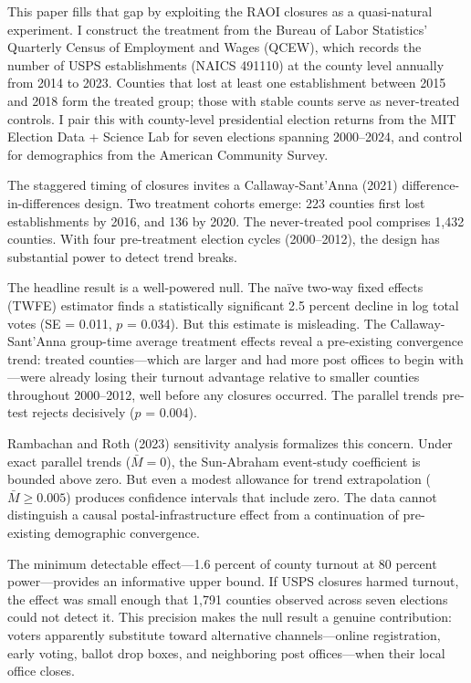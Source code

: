 \documentclass[12pt]{article}
\begin{document}
This paper fills that gap by exploiting the RAOI closures as a quasi-natural experiment. I construct the treatment from the Bureau of Labor Statistics' Quarterly Census of Employment and Wages (QCEW), which records the number of USPS establishments (NAICS 491110) at the county level annually from 2014 to 2023. Counties that lost at least one establishment between 2015 and 2018 form the treated group; those with stable counts serve as never-treated controls. I pair this with county-level presidential election returns from the MIT Election Data + Science Lab for seven elections spanning 2000--2024, and control for demographics from the American Community Survey.

The staggered timing of closures invites a Callaway-Sant'Anna (2021) difference-in-differences design. Two treatment cohorts emerge: 223 counties first lost establishments by 2016, and 136 by 2020. The never-treated pool comprises 1,432 counties. With four pre-treatment election cycles (2000--2012), the design has substantial power to detect trend breaks.

The headline result is a well-powered null. The na\"ive two-way fixed effects (TWFE) estimator finds a statistically significant 2.5 percent decline in log total votes (SE = 0.011, $p$ = 0.034). But this estimate is misleading. The Callaway-Sant'Anna group-time average treatment effects reveal a pre-existing convergence trend: treated counties---which are larger and had more post offices to begin with---were already losing their turnout advantage relative to smaller counties throughout 2000--2012, well before any closures occurred. The parallel trends pre-test rejects decisively ($p$ = 0.004).

Rambachan and Roth (2023) sensitivity analysis formalizes this concern. Under exact parallel trends ($\bar{M} = 0$), the Sun-Abraham event-study coefficient is bounded above zero. But even a modest allowance for trend extrapolation ($\bar{M} \geq 0.005$) produces confidence intervals that include zero. The data cannot distinguish a causal postal-infrastructure effect from a continuation of pre-existing demographic convergence.

The minimum detectable effect---1.6 percent of county turnout at 80 percent power---provides an informative upper bound. If USPS closures harmed turnout, the effect was small enough that 1,791 counties observed across seven elections could not detect it. This precision makes the null result a genuine contribution: voters apparently substitute toward alternative channels---online registration, early voting, ballot drop boxes, and neighboring post offices---when their local office closes.
\end{document}
